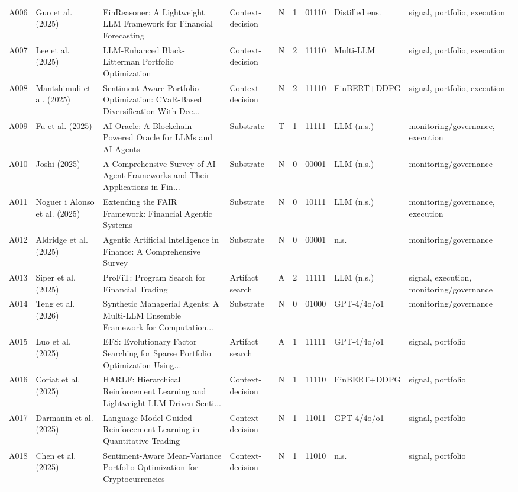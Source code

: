 \begin{longtable}{p{0.7cm} p{1.9cm} p{3.85cm} p{1.7cm} p{0.65cm} p{0.55cm} p{1.2cm} p{1.8cm} p{2.0cm}}
A006 & Guo et al. (2025) & FinReasoner: A Lightweight LLM Framework for Financial Forecasting & Context-decision & N & 1 & 01110 & Distilled ens. & signal, portfolio, execution \\
A007 & Lee et al. (2025) & LLM-Enhanced Black-Litterman Portfolio Optimization & Context-decision & N & 2 & 11110 & Multi-LLM & signal, portfolio, execution \\
A008 & Mantshimuli et al. (2025) & Sentiment-Aware Portfolio Optimization: CVaR-Based Diversification With Dee... & Context-decision & N & 2 & 11110 & FinBERT+DDPG & signal, portfolio, execution \\
A009 & Fu et al. (2025) & AI Oracle: A Blockchain-Powered Oracle for LLMs and AI Agents & Substrate & T & 1 & 11111 & LLM (n.s.) & monitoring/governance, execution \\
A010 & Joshi (2025) & A Comprehensive Survey of AI Agent Frameworks and Their Applications in Fin... & Substrate & N & 0 & 00001 & LLM (n.s.) & monitoring/governance \\
A011 & Noguer i Alonso et al. (2025) & Extending the FAIR Framework: Financial Agentic Systems & Substrate & N & 0 & 10111 & LLM (n.s.) & monitoring/governance, execution \\
A012 & Aldridge et al. (2025) & Agentic Artificial Intelligence in Finance: A Comprehensive Survey & Substrate & N & 0 & 00001 & n.s. & monitoring/governance \\
A013 & Siper et al. (2025) & ProFiT: Program Search for Financial Trading & Artifact search & A & 2 & 11111 & LLM (n.s.) & signal, execution, monitoring/governance \\
A014 & Teng et al. (2026) & Synthetic Managerial Agents: A Multi-LLM Ensemble Framework for Computation... & Substrate & N & 0 & 01000 & GPT-4/4o/o1 & monitoring/governance \\
A015 & Luo et al. (2025) & EFS: Evolutionary Factor Searching for Sparse Portfolio Optimization Using... & Artifact search & A & 1 & 11111 & GPT-4/4o/o1 & signal, portfolio \\
A016 & Coriat et al. (2025) & HARLF: Hierarchical Reinforcement Learning and Lightweight LLM-Driven Senti... & Context-decision & N & 1 & 11110 & FinBERT+DDPG & signal, portfolio \\
A017 & Darmanin et al. (2025) & Language Model Guided Reinforcement Learning in Quantitative Trading & Context-decision & N & 1 & 11011 & GPT-4/4o/o1 & signal, portfolio \\
A018 & Chen et al. (2025) & Sentiment-Aware Mean-Variance Portfolio Optimization for Cryptocurrencies & Context-decision & N & 1 & 11010 & n.s. & signal, portfolio \\

\end{longtable}
